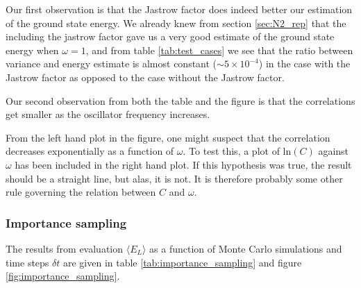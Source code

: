 Our first observation is that the Jastrow factor does indeed better our estimation of the ground state energy. 
We already knew from section \ref{sec:N2_rep} that the including the jastrow factor gave us a very good estimate of the ground state energy when $\omega = 1$, and from table \ref{tab:test_cases}  we see that the ratio between variance and energy estimate is almost constant ($\sim 5 \times 10^{-4}$) in the case with the Jastrow factor as opposed to the case without the Jastrow factor. 

Our second observation from both the table and the figure is that the correlations get smaller as the oscillator frequency increases. 

From the left hand plot in the figure, one might suspect that the correlation decreases exponentially as a function of $\omega$. 
To test this, a plot of $\textrm{ln}(C)$ against $\omega$ has been included in the right hand plot. 
If this hypothesis was true, the result should be a straight line, but alas, it is not. 
It is therefore probably some other rule governing the relation between $C$ and $\omega$. 





\subsubsection{Importance sampling}

The results from evaluation $\langle E_L \rangle$ as a function of Monte Carlo simulations and time steps $\delta t$ are given in table \ref{tab:importance_sampling} and figure \ref{fig:importance_sampling}.

